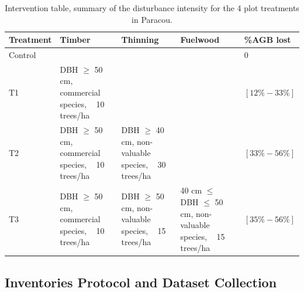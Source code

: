 \documentclass[fleqn,10pt]{ArtEcoFoG} %
\begin{document}
\begin{longtabu} to 
\caption{\label{tab:Tab1}Intervention table, summary of the disturbance intensity for the 4 plot treatments in Paracou.}\\
\toprule
Treatment & Timber & Thinning & Fuelwood & \%AGB lost\\
\midrule
Control &  &  &  & 0\\
T1 & DBH $\geq$ 50 cm, commercial species, ~ 10 trees/ha &  &  & $[12\%-33\%]$\\
T2 & DBH $\geq$ 50 cm, commercial species, ~ 10 trees/ha & DBH $\geq$ 40 cm, non-valuable species, ~ 30 trees/ha &  & $[33\%-56\%]$\\
T3 & DBH $\geq$ 50 cm, commercial species, ~ 10 trees/ha & DBH $\geq$ 50 cm, non-valuable species, ~ 15 trees/ha & 40 cm $\leq$ DBH $\leq$ 50 cm, non-valuable species, ~ 15 trees/ha & $[35\%-56\%]$\\
\bottomrule
\end{longtabu}

\subsection{Inventories Protocol and Dataset
Collection}\label{inventories-protocol-and-dataset-collection}
\end{document}

